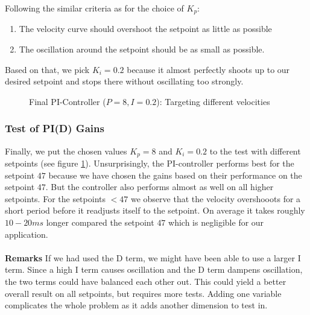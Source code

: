 Following the similar criteria as for the choice of $K_p$:
\begin{enumerate}
    \item The velocity curve should overshoot the setpoint as little as possible
    \item The oscillation around the setpoint should be as small as possible.
\end{enumerate}
Based on that, we pick $K_i = 0.2$ because it almost perfectly shoots up to our desired setpoint and stops there without oscillating too strongly.

\begin{figure}[H]
    \centering
{}
    \caption{Final PI-Controller ($P=8, I=0.2$): Targeting different velocities} \label{fig:PI_final}
\end{figure}

\subsubsection{Test of PI(D) Gains}
Finally, we put the chosen values $K_p = 8$ and $K_i = 0.2$ to the test with different setpoints (see figure \ref{fig:PI_final}). Unsurprisingly, the PI-controller performs best for the setpoint $47$ because we have chosen the gains based on their performance on the setpoint $47$.
But the controller also performs almost as well on all higher setpoints. For the setpoints $<47$ we observe that the velocity overshooots for a short period before it readjusts itself to the setpoint. On average it takes roughly $10-20 ms$ longer compared the setpoint $47$ which is negligible for our application.\\\\
\textbf{Remarks}
If we had used the D term, we might have been able to use a larger I term. Since a high I term causes oscillation and the D term dampens oscillation, the two terms could have balanced each other out. This could yield a better overall result on all setpoints, but requires more tests. Adding one variable complicates the whole problem as it adds another dimension to test in.


